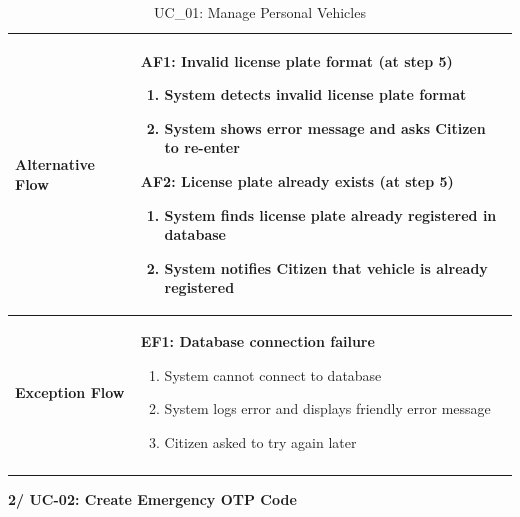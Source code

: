 \documentclass[a4paper]{article}
\newlength{\ucLeft}
\begin{document}
\begin{longtable}{|>{\bfseries}p{\ucLeft}|
                p{\dimexpr\textwidth-\ucLeft-4\tabcolsep-3\arrayrulewidth\relax}|}
\\ \hline
Alternative Flow &
\noindent \textbf{AF1: Invalid license plate format (at step 5)}
\begin{enumerate}
    \item System detects invalid license plate format
    \item System shows error message and asks Citizen to re-enter
\end{enumerate}
\noindent \textbf{AF2: License plate already exists (at step 5)}
\begin{enumerate}
    \item System finds license plate already registered in database
    \item System notifies Citizen that vehicle is already registered
\end{enumerate}
\\ \hline
Exception Flow &
\noindent \textbf{EF1: Database connection failure}
\begin{enumerate}
    \item System cannot connect to database
    \item System logs error and displays friendly error message
    \item Citizen asked to try again later
\end{enumerate}
\\ \hline
\caption{UC\_01: Manage Personal Vehicles}\label{tab:uc01}
\end{longtable}

\newpage
\noindent \textbf{2/ UC-02: Create Emergency OTP Code}
\setlength{\tabcolsep}{6pt}
\renewcommand{\arraystretch}{1.2}
\setlength{\ucLeft}{30mm}
\end{document}
